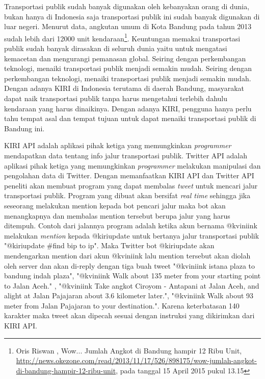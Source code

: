Transportasi publik sudah banyak digunakan oleh kebanyakan orang di dunia, bukan hanya di Indonesia saja transportasi publik ini sudah banyak digunakan di luar negeri. Menurut data, angkutan umum di Kota Bandung pada tahun 2013 sudah lebih dari 12000 unit kendaraan\footnote{Oris Riswan , Wow... Jumlah Angkot di Bandung hampir 12 Ribu Unit, \url{http://news.okezone.com/read/2013/11/17/526/898175/wow-jumlah-angkot-di-bandung-hampir-12-ribu-unit}, pada tanggal 15 April 2015 pukul 13.15}. Keuntungan memakai transportasi publik sudah banyak dirasakan di seluruh dunia yaitu untuk mengatasi kemacetan dan mengurangi pemanasan global. Seiring dengan perkembangan teknologi, menaiki transportasi publik menjadi semakin mudah. Seiring dengan perkembangan teknologi, menaiki transportasi publik menjadi semakin mudah. Dengan adanya KIRI di Indonesia terutama di daerah Bandung, masyarakat dapat naik transportasi publik tanpa harus mengetahui terlebih dahulu kendaraan yang harus dinaikinya. Dengan adanya KIRI, pengguna hanya perlu tahu tempat asal dan tempat tujuan untuk dapat menaiki transportasi publik di Bandung ini.

KIRI API adalah aplikasi pihak ketiga yang memungkinkan \textit{programmer} mendapatkan data tentang info jalur transportasi publik. Twitter API adalah aplikasi pihak ketiga yang memungkinkan \textit{programmer} melakukan manipulasi dan pengolahan data di Twitter. Dengan memanfaatkan KIRI API dan Twitter API peneliti akan membuat program yang dapat membalas \textit{tweet} untuk mencari jalur transportasi publik. Program yang dibuat akan bersifat \textit{real time} sehingga jika seseorang melakukan mention kepada bot pencari jalur maka bot akan menangkapnya dan membalas mention tersebut berupa jalur yang harus ditempuh. Contoh dari jalannya program adalah ketika akun bernama @kviniink melakukan \textit{mention} kepada @kiriupdate untuk bertanya jalur transportasi publik "@kiriupdate \#find bip to ip". Maka Twitter bot @kiriupdate akan mendengarkan mention dari akun @kviniink lalu mention tersebut akan diolah oleh server dan akan di-reply dengan tiga buah tweet "@kviniink istana plaza to bandung indah plaza", "@kviniink Walk about 135 meter from your starting point to Jalan Aceh." , "@kviniink Take angkot Ciroyom - Antapani at Jalan Aceh, and alight at Jalan Pajajaran about 3.6 kilometer later.", "@kviniink Walk about 93 meter from Jalan Pajajaran to your destination.". Karena keterbatasan 140 karakter maka tweet akan dipecah sesuai dengan instruksi yang dikirimkan dari KIRI API.

